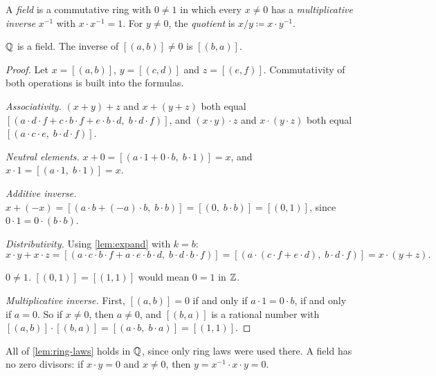 \begin{definition}[Field]
\label{def:field}
A \emph{field} is a commutative ring with $0 \neq 1$ in which every $x \neq 0$ has
a \emph{multiplicative inverse} $x^{-1}$ with $x \cdot x^{-1} = 1$. For $y \neq 0$,
the \emph{quotient} is $x / y \coloneqq x \cdot y^{-1}$.
\end{definition}

\begin{theorem}
\label{thm:rationals-field}
$\mathbb{Q}$ is a field. The inverse of $[(a, b)] \neq 0$ is $[(b, a)]$.
\end{theorem}

\begin{proof}
Let $x = [(a, b)]$, $y = [(c, d)]$ and $z = [(e, f)]$. Commutativity of both
operations is built into the formulas.

\emph{Associativity.} $(x + y) + z$ and $x + (y + z)$ both equal $[(a \cdot d \cdot
f + c \cdot b \cdot f + e \cdot b \cdot d,\; b \cdot d \cdot f)]$, and $(x \cdot y)
\cdot z$ and $x \cdot (y \cdot z)$ both equal $[(a \cdot c \cdot e,\; b \cdot d
\cdot f)]$.

\emph{Neutral elements.} $x + 0 = [(a \cdot 1 + 0 \cdot b,\; b \cdot 1)] = x$, and
$x \cdot 1 = [(a \cdot 1,\; b \cdot 1)] = x$.

\emph{Additive inverse.} $x + (-x) = [(a \cdot b + (-a) \cdot b,\; b \cdot b)] =
[(0,\; b \cdot b)] = [(0, 1)]$, since $0 \cdot 1 = 0 \cdot (b \cdot b)$.

\emph{Distributivity.} Using \cref{lem:expand} with $k = b$:
\[
  x \cdot y + x \cdot z = [(a \cdot c \cdot b \cdot f + a \cdot e \cdot b \cdot
  d,\; b \cdot d \cdot b \cdot f)] = [(a \cdot (c \cdot f + e \cdot d),\; b \cdot d
  \cdot f)] = x \cdot (y + z).
\]

\emph{$0 \neq 1$.} $[(0, 1)] = [(1, 1)]$ would mean $0 = 1$ in $\mathbb{Z}$.

\emph{Multiplicative inverse.} First, $[(a, b)] = 0$ if and only if $a \cdot 1 = 0
\cdot b$, if and only if $a = 0$. So if $x \neq 0$, then $a \neq 0$, and $[(b, a)]$
is a rational number with $[(a, b)] \cdot [(b, a)] = [(a \cdot b,\; b \cdot a)] =
[(1, 1)]$.
\end{proof}

All of \cref{lem:ring-laws} holds in $\mathbb{Q}$, since only ring laws were used there.
A field has no zero divisors: if $x \cdot y = 0$ and $x \neq 0$, then $y = x^{-1}
\cdot x \cdot y = 0$.

